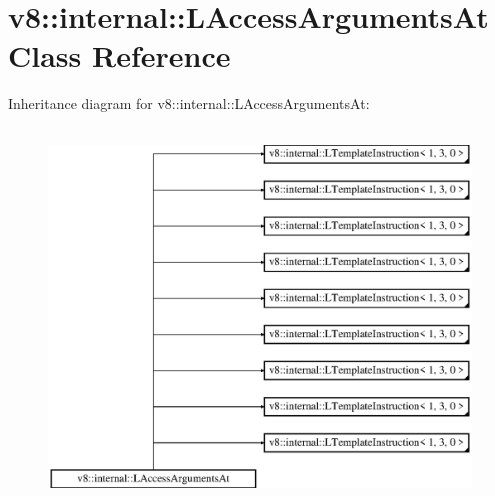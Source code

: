 \hypertarget{classv8_1_1internal_1_1_l_access_arguments_at}{}\section{v8\+:\+:internal\+:\+:L\+Access\+Arguments\+At Class Reference}
\label{classv8_1_1internal_1_1_l_access_arguments_at}
Inheritance diagram for v8\+:\+:internal\+:\+:L\+Access\+Arguments\+At\+:\begin{figure}[H]
\begin{center}
\leavevmode
\includegraphics[height=10.000000cm]{classv8_1_1internal_1_1_l_access_arguments_at}
\end{center}
\end{figure}
